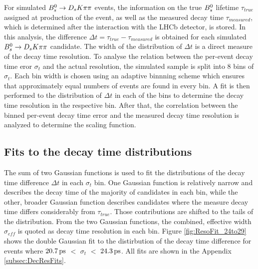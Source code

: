 For simulated ${{B}^0_{s}}\rightarrow{\ensuremath{{D}_{s}}}{\ensuremath{K}}{\ensuremath{\pi}}{\ensuremath{\pi}}$ events, the information on the true ${{B}^0_{s}}$ lifetime $\tau_{true}$ assigned at production of the event, 
as well as the measured decay time $\tau_{measured}$, which is determined after the interaction with the LHCb detector, is stored. 
In this analysis, the difference $\Delta t = \tau_{true} - \tau_{measured}$ is obtained for each simulated ${{B}^0_{s}}\rightarrow{\ensuremath{{D}_{s}}}{\ensuremath{K}}{\ensuremath{\pi}}{\ensuremath{\pi}}$ candidate. 
The width of the distribution of $\Delta t$ is a direct measure of the decay time resolution. \newline 
To analyse the relation between the per-event decay time eror $\sigma_{t}$ and the actual resolution, the simulated sample is split into 8 bins of $\sigma_{t}$. 
Each bin width is chosen using an adaptive binnning scheme which ensures that approximately equal numbers of events are found in every bin.  
A fit is then performed to the distribution of $\Delta t$ in each of the bins to determine the decay time resolution in the respective bin. 
After that, the correlation between the binned per-event decay time error and the measured decay time resolution is analyzed to determine the scaling function.     


\subsection{Fits to the decay time distributions}

The sum of two Gaussian functions is used to fit the distributions of the decay time difference $\Delta t$ in each $\sigma_{t}$ bin.
One Gaussian function is relatively narrow and describes the decay time of the majority of candidates in each bin, 
while the other, broader Gaussian function describes candidates where the measure decay time differs considerably from $\tau_{true}$. 
Those contributions are shifted to the tails of the distribution. From the two Gaussian functions, the combined, effective width $\sigma_{eff}$ is quoted as decay time resolution in each bin. 
Figure \ref{fig:ResoFit_24to29} shows the double Gaussian fit to the distirbution of the decay time difference for events where $20.7{\mathrm{ \,ps}}$ $<$ $\sigma_{t}$ $<$ $24.3{\mathrm{ \,ps}}$. 
All fits are shown in the Appendix \ref{subsec:DecResFits}. \newline

